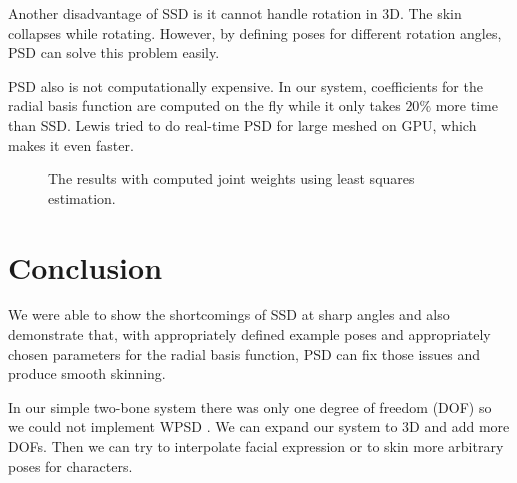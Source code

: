 \documentclass[11pt,twocolumn,letterpaper]{article}
\begin{document}
Another disadvantage of SSD is it cannot handle rotation in 3D. The skin collapses while rotating. However, by defining poses for different rotation angles, PSD can solve this problem easily.

PSD also is not computationally expensive. In our system, coefficients for the radial basis function are computed on the fly while it only takes $20\%$ more time than SSD. Lewis \cite{rhee2006real} tried to do real-time PSD for large meshed on GPU, which makes it even faster. 

\begin{figure}[t]
\begin{center}
\end{center}
   \caption{The results with computed joint weights using least squares estimation.}
\label{fig:long}
\label{fig:onecol}
\label{com_w}
\end{figure}

\section{Conclusion}

We were able to show the shortcomings of SSD at sharp angles and also demonstrate that, with appropriately defined example poses and appropriately chosen parameters for the radial basis function, PSD can fix those issues and produce smooth skinning.

In our simple two-bone system there was only one degree of freedom (DOF) so we could not implement WPSD \cite{kurihara2004modeling}. We can expand our system to 3D and add more DOFs. Then we can try to interpolate facial expression or to skin more arbitrary poses for characters. 
\end{document}

